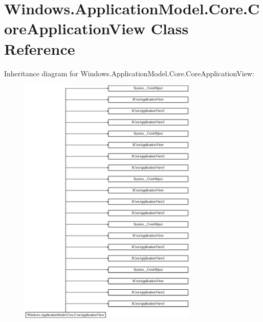 \hypertarget{class_windows_1_1_application_model_1_1_core_1_1_core_application_view}{}\section{Windows.\+Application\+Model.\+Core.\+Core\+Application\+View Class Reference}
\label{class_windows_1_1_application_model_1_1_core_1_1_core_application_view}
Inheritance diagram for Windows.\+Application\+Model.\+Core.\+Core\+Application\+View\+:\begin{figure}[H]
\begin{center}
\leavevmode
\includegraphics[height=12.000000cm]{class_windows_1_1_application_model_1_1_core_1_1_core_application_view}
\end{center}
\end{figure}
